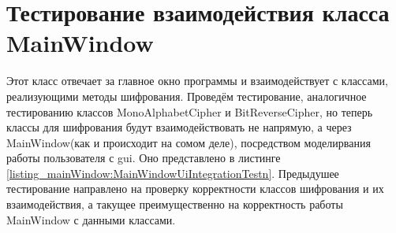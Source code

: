 \documentclass[a4paper,12pt]{article}
\begin{document}
\newpage\section{Тестирование взаимодействия класса MainWindow}
Этот класс отвечает за главное окно программы и взаимодействует с классами, реализующими методы шифрования. Проведём тестирование, аналогичное тестированию классов MonoAlphabetCipher и BitReverseCipher, но теперь классы для шифрования будут взаимодействовать не напрямую, а через MainWindow(как и происходит на сомом деле), посредством моделирвания работы пользователя с gui. Оно представлено в листинге \ref{listing_mainWindow:MainWindowUiIntegrationTestn}. Предыдушее тестирование направлено на проверку корректности классов шифрования и их взаимодействия, а такущее преимущественно на корректность работы MainWindow с данными классами.
\end{document}
